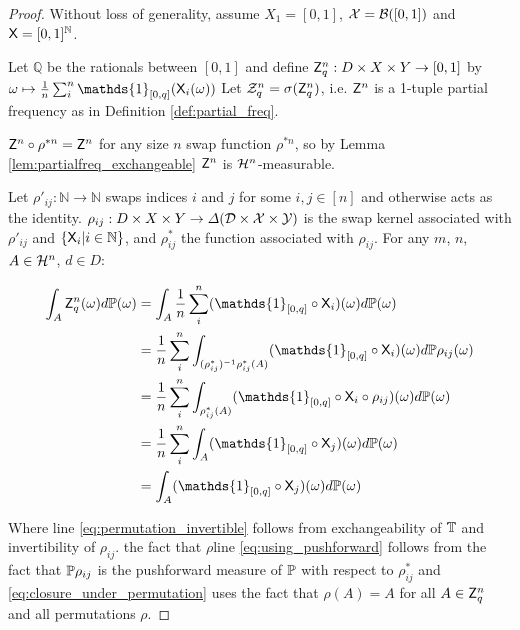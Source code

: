 \begin{proof}
Without loss of generality, assume $X_1=[0,1]$, $\mathcal{X}=\mathcal{B}([0,1])$ and $\mathsf{X}=[0,1]^{\mathbb{N}}$.

Let $\mathbb{Q}$ be the rationals between $[0,1]$ and define $\mathsf{Z}_q^n:D\times X\times Y \to [0,1]$ by $\omega \mapsto \frac{1}{n}\sum_{i}^n \mathds{1}_{[0,q]}(\RV{X}_i(\omega))$ Let $\mathcal{Z}^n_q=\sigma(\mathsf{Z}_q^n)$, i.e. $\mathsf{Z}^n$ is a 1-tuple partial frequency as in Definition \ref{def:partial_freq}.

$\mathsf{Z}^n\circ\rho^{*n}=\mathsf{Z}^n$ for any size $n$ swap function $\rho^{*n}$, so by Lemma \ref{lem:partialfreq_exchangeable} $\mathsf{Z}^n$ is $\mathcal{H}^n$-measurable.

Let $\rho'_{ij}:\mathbb{N}\to\mathbb{N}$ swaps indices $i$ and $j$ for some $i,j\in[n]$ and otherwise acts as the identity. $\rho_{ij}:D\times X\times Y\to \Delta(\mathcal{D}\times \mathcal{X}\times \mathcal{Y})$ is the swap kernel associated with $\rho'_{ij}$ and $\{\mathsf{X}_i|i\in \mathbb{N}\}$, and $\rho^*_{ij}$ the function associated with $\rho_{ij}$. For any $m$, $n$, $A\in \mathcal{H}^n$, $d\in D$: 

\begin{align}
    \int_{A} \RV{Z}_q^{n} (\omega) d\prob{P}(\omega) &= \int_{A} \frac{1}{n}\sum_{i}^{n} (\mathds{1}_{[0,q]}\circ \RV{X}_i)(\omega)d\prob{P}(\omega)\\
    &= \frac{1}{n}\sum_{i}^{n} \int_{(\rho^*_{ij})^{-1}\rho^*_{ij}(A)} (\mathds{1}_{[0,q]}\circ \RV{X}_i)(\omega)d\prob{P}\rho_{ij}(\omega)\label{eq:permutation_invertible}\\
    &= \frac{1}{n}\sum_{i}^{n} \int_{\rho^*_{ij}(A)} (\mathds{1}_{[0,q]}\circ \RV{X}_{i}\circ \rho_{ij}) (\omega)d\prob{P}(\omega)\label{eq:using_pushforward}\\
    &= \frac{1}{n}\sum_{i}^{n} \int_{A} (\mathds{1}_{[0,q]}\circ \RV{X}_{j})(\omega)d\prob{P}(\omega)\label{eq:closure_under_permutation}\\
    &= \int_{A} (\mathds{1}_{[0,q]} \circ \RV{X}_j)(\omega)d\prob{P}(\omega) \label{eq:cond_expectation_first}
\end{align}

Where line \ref{eq:permutation_invertible} follows from exchangeability of $\mathbb{T}$ and invertibility of $\rho_{ij}$. the fact that $\rho$line \ref{eq:using_pushforward} follows from the fact that $\mathbb{P}\rho_{ij}$ is the pushforward measure of $\mathbb{P}$ with respect to $\rho^*_{ij}$ and \ref{eq:closure_under_permutation} uses the fact that $\rho(A) = A$ for all $A\in \mathsf{Z}^n_q$ and all permutations $\rho$.


\end{proof}
